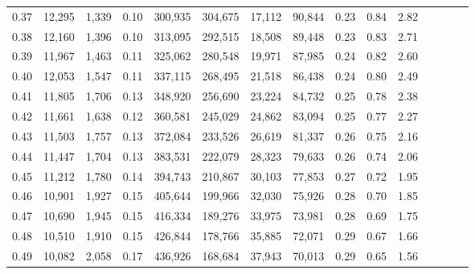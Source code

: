 \begin{tabular}{rrrcrrrrrrrrrrr}
0.37 &  12,295 &  1,339 &                                       0.10 &  300,935 &  304,675 &   17,112 &   90,844 &  0.23 &  0.84 &                         2.82 \\
0.38 &  12,160 &  1,396 &                                       0.10 &  313,095 &  292,515 &   18,508 &   89,448 &  0.23 &  0.83 &                         2.71 \\
0.39 &  11,967 &  1,463 &                                       0.11 &  325,062 &  280,548 &   19,971 &   87,985 &  0.24 &  0.82 &                         2.60 \\
0.40 &  12,053 &  1,547 &                                       0.11 &  337,115 &  268,495 &   21,518 &   86,438 &  0.24 &  0.80 &                         2.49 \\
0.41 &  11,805 &  1,706 &                                       0.13 &  348,920 &  256,690 &   23,224 &   84,732 &  0.25 &  0.78 &                         2.38 \\
0.42 &  11,661 &  1,638 &                                       0.12 &  360,581 &  245,029 &   24,862 &   83,094 &  0.25 &  0.77 &                         2.27 \\
0.43 &  11,503 &  1,757 &                                       0.13 &  372,084 &  233,526 &   26,619 &   81,337 &  0.26 &  0.75 &                         2.16 \\
0.44 &  11,447 &  1,704 &                                       0.13 &  383,531 &  222,079 &   28,323 &   79,633 &  0.26 &  0.74 &                         2.06 \\
0.45 &  11,212 &  1,780 &                                       0.14 &  394,743 &  210,867 &   30,103 &   77,853 &  0.27 &  0.72 &                         1.95 \\
0.46 &  10,901 &  1,927 &                                       0.15 &  405,644 &  199,966 &   32,030 &   75,926 &  0.28 &  0.70 &                         1.85 \\
0.47 &  10,690 &  1,945 &                                       0.15 &  416,334 &  189,276 &   33,975 &   73,981 &  0.28 &  0.69 &                         1.75 \\
0.48 &  10,510 &  1,910 &                                       0.15 &  426,844 &  178,766 &   35,885 &   72,071 &  0.29 &  0.67 &                         1.66 \\
0.49 &  10,082 &  2,058 &                                       0.17 &  436,926 &  168,684 &   37,943 &   70,013 &  0.29 &  0.65 &                         1.56 \\

\end{tabular}
